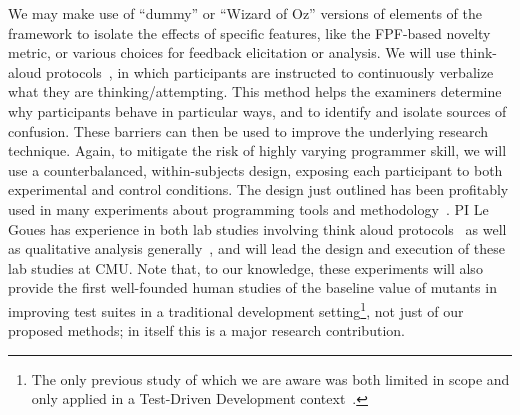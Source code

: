 We may make use of ``dummy'' or ``Wizard of Oz'' versions of elements of the
framework to isolate the effects of specific features, like the FPF-based
novelty metric, or various choices for feedback elicitation or analysis.
We will use
think-aloud protocols~\cite{thinkaloud}, in which participants are instructed to
continuously verbalize what they are thinking/attempting. This method helps the
examiners determine why participants behave in particular ways, and to identify
and isolate sources of confusion.  These barriers can then be used to improve
the underlying research technique.  Again, to mitigate the risk of highly varying
programmer skill, we will use a counterbalanced, within-subjects design,
exposing each participant to both experimental and control conditions.  The
design just outlined has been profitably used in many
experiments about programming tools and
methodology~\cite{Endrikat2014,Stylos07}.  PI Le Goues has experience in both
lab studies involving think aloud protocols~\cite{frameworkDebugging} as well as
qualitative analysis generally~\cite{testingUnderReview}, and will lead the
design and execution of these lab studies at CMU.  Note that, to our
knowledge, these experiments will also provide the first well-founded
human studies of the baseline value of mutants in improving test
suites in a traditional development setting\footnote{The only previous
  study of which we are aware was both limited in scope and only applied in a Test-Driven
  Development context~\cite{tddmut}.}, not
just of our proposed methods; in itself this is a major research contribution.


